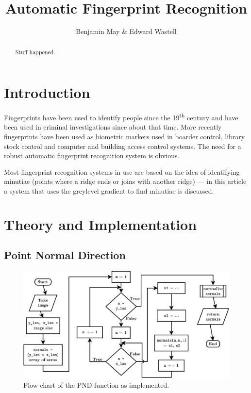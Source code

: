 \documentclass[11pt,a4paper]{article}
\title{Automatic Fingerprint Recognition}
\author{Benjamin May \& Edward Wastell}
\begin{document}
\maketitle

\begin{abstract}
Stuff happened.
\end{abstract}

\begin{multicols}{2}

\section{Introduction}
	Fingerprints have been used to identify people since the 19\textsuperscript{th} century and have been used in criminal investigations since about that time. More recently fingerprints have been used as biometric markers used in boarder control, library stock control and computer and building access control systems. The need for a robust automatic fingerprint recognition system is obvious.

	Most fingerprint recognition systems in use are based on the idea of identifying minutiae (points where a ridge ends or joins with another ridge) --- in this article a system that uses the greylevel gradient to find minutiae is discussed.

\section{Theory and Implementation}

	\subsection{Point Normal Direction}
\begin{figure}
\centering
\includegraphics[width = \textwidth]{PND}
\caption{Flow chart of the PND function as implemented.}
\label{fig:PND-alg}
\end{figure}


\end{multicols}
\end{document}
